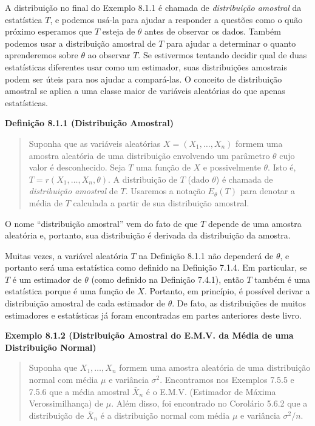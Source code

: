 A distribuição no final do Exemplo 8.1.1 é chamada de \textit{distribuição amostral} da estatística $T$, e podemos usá-la para ajudar a responder a questões como o quão próximo esperamos que $T$ esteja de $\theta$ antes de observar os dados. Também podemos usar a distribuição amostral de $T$ para ajudar a determinar o quanto aprenderemos sobre $\theta$ ao observar $T$. Se estivermos tentando decidir qual de duas estatísticas diferentes usar como um estimador, suas distribuições amostrais podem ser úteis para nos ajudar a compará-las. O conceito de distribuição amostral se aplica a uma classe maior de variáveis aleatórias do que apenas estatísticas.

\vspace{1em}
\noindent\textbf{Definição 8.1.1 (Distribuição Amostral)}
\begin{quote}
    Suponha que as variáveis aleatórias $X = (X_1, \dots, X_n)$ formem uma amostra aleatória de uma distribuição envolvendo um parâmetro $\theta$ cujo valor é desconhecido. Seja $T$ uma função de $X$ e possivelmente $\theta$. Isto é, $T = r(X_1, \dots, X_n, \theta)$. A distribuição de $T$ (dado $\theta$) é chamada de \textit{distribuição amostral} de $T$. Usaremos a notação $E_\theta(T)$ para denotar a média de $T$ calculada a partir de sua distribuição amostral.
\end{quote}
\vspace{1em}

O nome “distribuição amostral” vem do fato de que $T$ depende de uma amostra aleatória e, portanto, sua distribuição é derivada da distribuição da amostra.

Muitas vezes, a variável aleatória $T$ na Definição 8.1.1 não dependerá de $\theta$, e portanto será uma estatística como definido na Definição 7.1.4. Em particular, se $T$ é um estimador de $\theta$ (como definido na Definição 7.4.1), então $T$ também é uma estatística porque é uma função de $X$. Portanto, em princípio, é possível derivar a distribuição amostral de cada estimador de $\theta$. De fato, as distribuições de muitos estimadores e estatísticas já foram encontradas em partes anteriores deste livro.

\vspace{1em}
\noindent\textbf{Exemplo 8.1.2 (Distribuição Amostral do E.M.V. da Média de uma Distribuição Normal)}
\begin{quote}
    Suponha que $X_1, \dots, X_n$ formem uma amostra aleatória de uma distribuição normal com média $\mu$ e variância $\sigma^2$. Encontramos nos Exemplos 7.5.5 e 7.5.6 que a média amostral $\bar{X}_n$ é o E.M.V. (Estimador de Máxima Verossimilhança) de $\mu$. Além disso, foi encontrado no Corolário 5.6.2 que a distribuição de $\bar{X}_n$ é a distribuição normal com média $\mu$ e variância $\sigma^2/n$.
\end{quote}
\vspace{1em}

